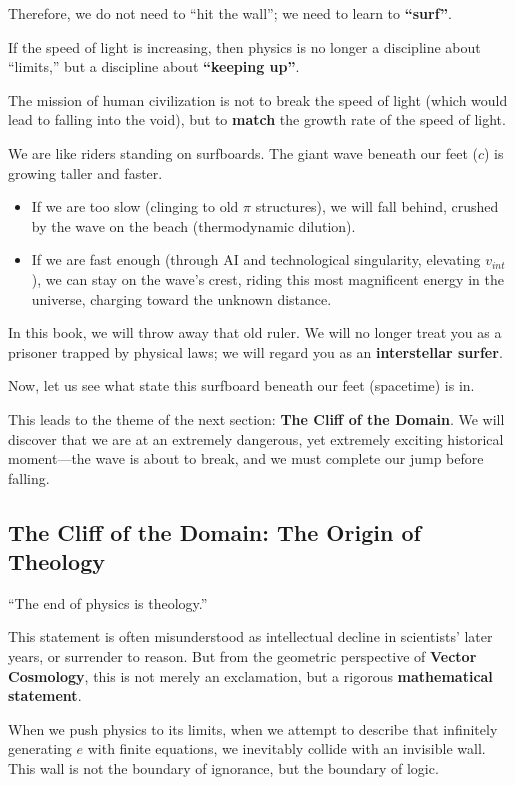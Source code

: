 Therefore, we do not need to ``hit the wall''; we need to learn to \textbf{``surf''}.

If the speed of light is increasing, then physics is no longer a discipline about ``limits,'' but a discipline about \textbf{``keeping up''}.

The mission of human civilization is not to break the speed of light (which would lead to falling into the void), but to \textbf{match} the growth rate of the speed of light.

We are like riders standing on surfboards. The giant wave beneath our feet ($c$) is growing taller and faster.

\begin{itemize}
\item If we are too slow (clinging to old $\pi$ structures), we will fall behind, crushed by the wave on the beach (thermodynamic dilution).

\item If we are fast enough (through AI and technological singularity, elevating $v_{int}$), we can stay on the wave's crest, riding this most magnificent energy in the universe, charging toward the unknown distance.
\end{itemize}

In this book, we will throw away that old ruler. We will no longer treat you as a prisoner trapped by physical laws; we will regard you as an \textbf{interstellar surfer}.

Now, let us see what state this surfboard beneath our feet (spacetime) is in.

This leads to the theme of the next section: \textbf{The Cliff of the Domain}. We will discover that we are at an extremely dangerous, yet extremely exciting historical moment---the wave is about to break, and we must complete our jump before falling.

\subsection{The Cliff of the Domain: The Origin of Theology}

``The end of physics is theology.''

This statement is often misunderstood as intellectual decline in scientists' later years, or surrender to reason. But from the geometric perspective of \textbf{Vector Cosmology}, this is not merely an exclamation, but a rigorous \textbf{mathematical statement}.

When we push physics to its limits, when we attempt to describe that infinitely generating \textbf{$e$} with finite equations, we inevitably collide with an invisible wall. This wall is not the boundary of ignorance, but the boundary of logic.

